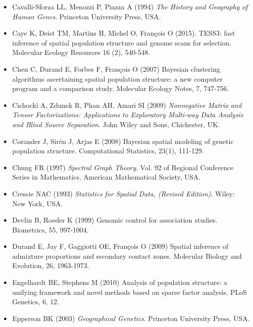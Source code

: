 \begin{itemize}
\item[] Cavalli-Sforza LL, Menozzi P, Piazza A (1994) {\it The History and Geography of Human Genes}. Princeton University Press, USA.

\item[] Caye K, Deist TM, Martins H, Michel O, Fran\c cois O (2015). TESS3: fast inference of spatial population structure and genome scans for selection. Molecular Ecology Resources 16 (2), 540-548.

\item[] Chen C, Durand E, Forbes F, Fran\c cois O (2007) Bayesian clustering algorithms ascertaining spatial population structure: a new computer program and a comparison study. Molecular Ecology Notes, 7, 747-756.

\item[]  Cichocki A, Zdunek R, Phan AH, Amari SI (2009) {\it Nonnegative Matrix and Tensor Factorizations: Applications to Exploratory Multi-way Data Analysis and Blind Source Separation}. John Wiley and Sons, Chichester, UK.

\item[] Corander J, Sir\'en J,  Arjas E (2008) Bayesian spatial modeling of genetic population structure. Computational Statistics, 23(1), 111-129.

\item[] Chung FR (1997) {\it Spectral Graph Theory}. Vol. 92 of Regional Conference Series in Mathematics, American Mathematical Society, USA.

\item[] Cressie NAC (1993) {\it Statistics for Spatial Data, (Revised Edition)}. Wiley: New York, USA.

\item[] Devlin B, Roeder K (1999) Genomic control for association studies. Biometrics, 55, 997-1004.

\item[] Durand E, Jay F, Gaggiotti OE, Fran\c cois O (2009) Spatial inference of admixture proportions and secondary contact zones. Molecular Biology and Evolution, 26, 1963-1973.

\item[] Engelhardt BE, Stephens M (2010) Analysis of population structure: a unifying framework and novel methods based on sparse factor analysis. PLoS Genetics, 6, 12.

\item[] Epperson BK (2003) {\it Geographical Genetics}. Princeton University Press, USA.



\end{itemize}
